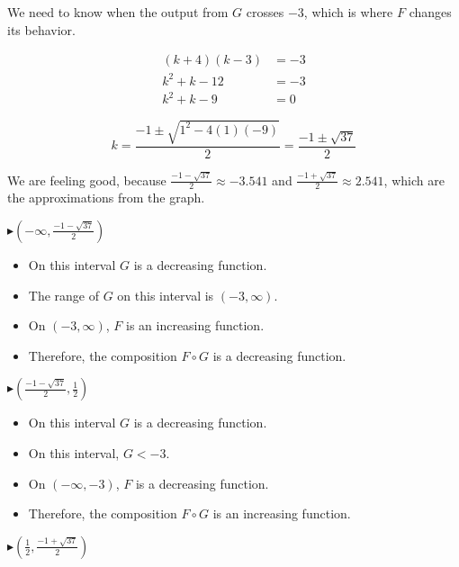 \documentclass{ximera}
\begin{document}
\begin{example}
We need to know when the output from $G$ crosses $-3$, which is where $F$ changes its behavior.





\begin{align*}
(k+4)(k-3) & = -3 \\
 k^2 + k - 12           & = -3  \\
 k^2 + k - 9         & = 0
\end{align*}


\[
k = \frac{-1 \pm \sqrt{1^2 - 4 (1) (-9)}}{2} = \frac{-1 \pm \sqrt{37}}{2} 
\]


We are feeling good, because $\frac{-1 - \sqrt{37}}{2} \approx -3.541$ and $\frac{-1 + \sqrt{37}}{2} \approx 2.541$, which are the approximations from the graph.






\textbf{\textcolor{blue!55!black}{$\blacktriangleright (-\infty, \frac{-1 - \sqrt{37}}{2})$}}


\begin{itemize}
\item On this interval $G$ is a decreasing function.
\item The range of $G$ on this interval is $(-3, \infty)$.
\item On $(-3, \infty)$, $F$ is an increasing function.
\item Therefore, the composition $F \circ G$ is a decreasing function.
\end{itemize}









\textbf{\textcolor{blue!55!black}{$\blacktriangleright (\frac{-1 - \sqrt{37}}{2}, \frac{1}{2})$}}


\begin{itemize}
\item On this interval $G$ is a decreasing function.
\item On this interval, $G < -3$.
\item On $(-\infty, -3)$, $F$ is a decreasing function.
\item Therefore, the composition $F \circ G$ is an increasing function.
\end{itemize}








\textbf{\textcolor{blue!55!black}{$\blacktriangleright (\frac{1}{2}, \frac{-1 + \sqrt{37}}{2})$}}



\end{example}
\end{document}
